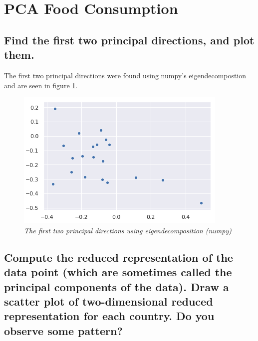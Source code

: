 \documentclass[a4paper]{article}
\begin{document}
\section{PCA Food Consumption}
\subsection{Find the first two principal directions, and plot them.}
The first two principal directions were found using numpy's eigendecompostion and are seen in figure \ref{fig:dirs}.

\begin{figure}[h]
    	\centering
        \includegraphics{principal_dirs.png}
        \caption{\it The first two principal directions using eigendecomposition (numpy)}
        \label{fig:dirs}
\end{figure}
\subsection{Compute the reduced representation of the data point (which are sometimes called the principal components of the data). Draw a scatter plot of two-dimensional reduced representation for each country.
Do you observe some pattern?}
\end{document}

